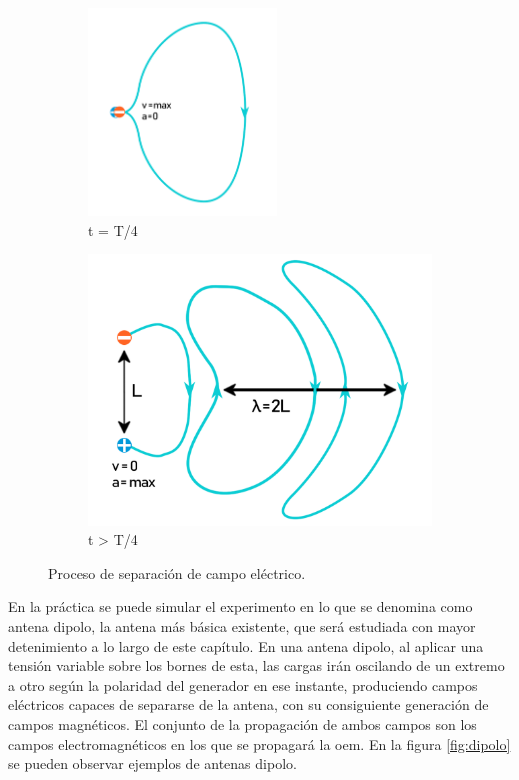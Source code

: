 \begin{figure}[h]
\begin{subfigure}[b]{0.3\textwidth}
		\label{fig:campo2}
	\end{subfigure}
	\begin{subfigure}[b]{0.3\textwidth} %
	\centering
		\includegraphics[width=5cm]{archivos/campos/campos3} %
		\caption{t = T/4}
		\label{fig:campo3}
	\end{subfigure}
	\begin{subfigure}[h]{0.5\textwidth} %
	\centering
	\includegraphics[width=10cm]{archivos/campos/campos4} %
	\caption{t > T/4}
	\label{fig:campo4}
\end{subfigure}
\caption{Proceso de separación de campo eléctrico.}\label{sistemass}
\end{figure}

\par En la práctica se puede simular el experimento en lo que se denomina como antena dipolo, la antena más básica existente, que será estudiada con mayor detenimiento a lo largo de este capítulo. En una antena dipolo, al aplicar una tensión variable sobre los bornes de esta, las cargas irán oscilando de un extremo a otro según la polaridad del generador en ese instante, produciendo campos eléctricos capaces de separarse de la antena, con su consiguiente generación de campos magnéticos. El conjunto de la propagación de ambos campos son los campos electromagnéticos en los que se propagará la \gls{oem}. En la figura \ref{fig:dipolo} se pueden observar ejemplos de antenas dipolo. 

